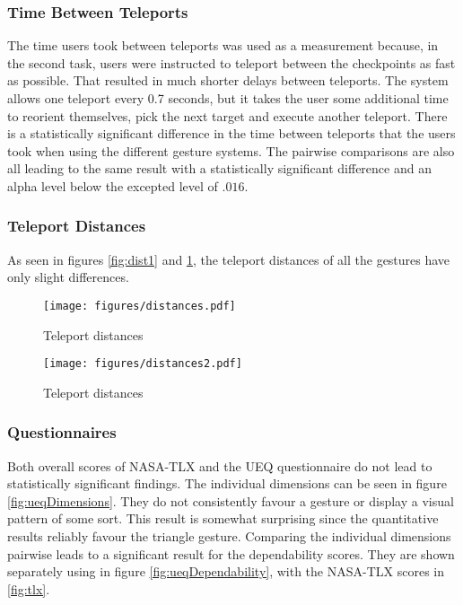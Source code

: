 \subsubsection{Time Between Teleports}
The time users took between teleports was used as a measurement because, in the second task, users were instructed to teleport between the checkpoints as fast as possible. That resulted in much shorter delays between teleports. The system allows one teleport every 0.7 seconds, but it takes the user some additional time to reorient themselves, pick the next target and execute another teleport. There is a statistically significant difference in the time between teleports that the users took when using the different gesture systems. The pairwise comparisons are also all leading to the same result with a statistically significant difference and an alpha level below the excepted level of $.016$. 

\subsubsection{Teleport Distances}
As seen in figures \ref{fig:dist1} and \ref{fig:dist2}, the teleport distances of all the gestures have only slight differences. 

\begin{figure}[!htb]
        \texttt{[image: figures/distances.pdf]}
        \caption{Teleport distances}
        \label{fig:dist1}
    \endminipage\hfill
        \texttt{[image: figures/distances2.pdf]}
        \caption{Teleport distances}
        \label{fig:dist2}
    \endminipage\hfill
\end{figure}

\subsubsection{Questionnaires}
Both overall scores of NASA-TLX and the UEQ questionnaire do not lead to statistically significant findings. The individual dimensions can be seen in figure \ref{fig:ueqDimensions}. They do not consistently favour a gesture or display a visual pattern of some sort. This result is somewhat surprising since the quantitative results reliably favour the triangle gesture. Comparing the individual dimensions pairwise leads to a significant result for the dependability scores. They are shown separately using in figure \ref{fig:ueqDependability}, with the NASA-TLX scores in \ref{fig:tlx}. 

